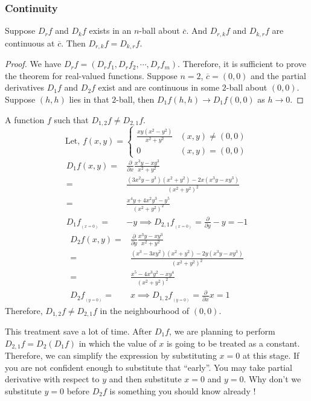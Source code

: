 \subsubsection{Continuity}
\begin{theorem}
	Suppose $D_r f$ and $D_k f$ exists in an $n$-ball about $\overline{c}$. And $D_{r,k} f$ and $D_{k,r} f$ are continuous at $\overline{c}$. Then $D_{r,k} f = D_{k,r} f$.
\end{theorem}
\begin{proof}
	We have $D_r f = (D_r f_1 , D_r f_2, \cdots, D_r f_m)$. Therefore, it is sufficient to prove the theorem for real-valued functions. Suppose $n = 2$, $\overline{c} = (0,0)$ and the partial derivatives $D_1 f$ and $D_2 f$ exist and are continuous in some $2$-ball about $(0,0)$. Suppose $(h,h)$ lies in that $2$-ball, then $D_1 f(h,h) \to D_1 f(0,0)$ as $h \to 0$.
\end{proof}

\begin{remark} A function $f$ such that $D_{1,2} f \ne D_{2,1} f$.
	\[ \text{Let, }f(x,y) = \begin{cases} \frac{xy(x^2-y^2)}{x^2+y^2} & (x,y) \ne (0,0) \\ 0 & (x,y) = (0,0) \end{cases} \]
	\begin{align*}
		D_1 f(x,y) = & \frac{\partial}{\partial x} \frac{x^3y-xy^3}{x^2+y^2} \\
		= & \frac{(3x^2y-y^3)(x^2+y^2) - 2x(x^3y-xy^3)}{(x^2+y^2)^2} \\
		= & \frac{x^4y+4x^2y^3-y^5}{(x^2+y^2)^2}\\
		D_1 f_{_{(x = 0)}} = & -y \implies D_{2,1} f_{_{(x = 0)}} = \frac{\partial}{\partial y} -y = -1
	\end{align*}
	\begin{align*}
		D_2 f(x,y) = & \frac{\partial}{\partial y} \frac{x^3y-xy^3}{x^2+y^2} \\
		= & \frac{(x^3-3xy^2)(x^2+y^2)-2y(x^3y-xy^3)}{(x^2+y^2)^2} \\
		= & \frac{x^5-4x^3y^2-xy^4}{(x^2+y^2)^2} \\
		D_2 f_{_{(y = 0)}} = & x \implies D_{1,2} f_{_{(y = 0)}}  = \frac{\partial}{\partial x} x = 1
	\end{align*}
	Therefore, $D_{1,2} f \ne D_{2,1} f$ in the neighbourhood of $(0,0)$.
	\begin{commentary} This treatment save a lot of time. After $D_1 f$, we are planning to perform $D_{2,1} f = D_2 (D_1 f)$ in which the value of $x$ is going to be treated as a constant. Therefore, we can simplify the expression by substituting $x = 0$ at this stage. If you are not confident enough to substitute that ``early''. You may take partial derivative with respect to $y$ and then substitute $x = 0$ and $y = 0$. Why don't we substitute $y = 0$ before $D_2 f$ is something you should know already !\end{commentary}
\end{remark}

